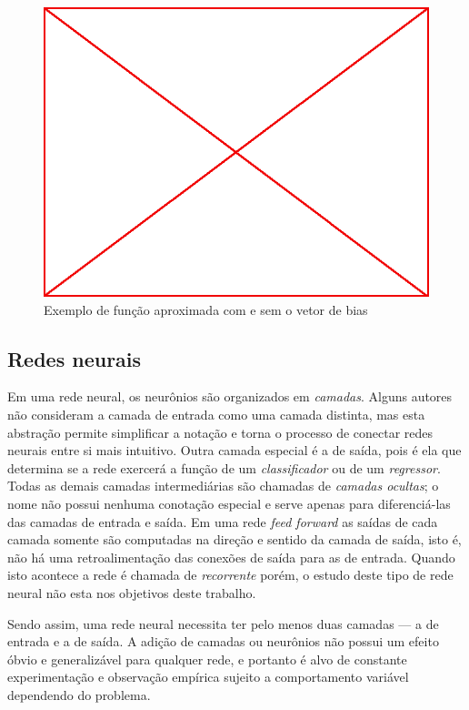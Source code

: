 \begin{figure}
  \caption{Exemplo de função aproximada com e sem o vetor de bias}
  \begin{center}
    \includegraphics[scale=0.5]{placeholder}
  \end{center}
\end{figure}

\subsection{Redes neurais}

Em uma rede neural, os neurônios são organizados em \emph{camadas}. Alguns
autores não consideram a camada de entrada como uma camada distinta, mas esta
abstração permite simplificar a notação e torna o processo de conectar redes
neurais entre si mais intuitivo. Outra camada especial é a de saída, pois é
ela que determina se a rede exercerá a função de um \emph{classificador} ou de
um \emph{regressor}. Todas as demais camadas intermediárias são chamadas de
\emph{camadas ocultas}; o nome não possui nenhuma conotação especial e serve
apenas para diferenciá-las das camadas de entrada e saída. Em uma rede
\emph{feed forward} as saídas de cada camada somente são computadas na direção
e sentido da camada de saída, isto é, não há uma retroalimentação das conexões
de saída para as de entrada. Quando isto acontece a rede é chamada de
\emph{recorrente} porém, o estudo deste tipo de rede neural não esta nos
objetivos deste trabalho.

Sendo assim, uma rede neural necessita ter pelo menos duas camadas --- a de
entrada e a de saída. A adição de camadas ou neurônios não possui um efeito
óbvio e generalizável para qualquer rede, e portanto é alvo de constante
experimentação e observação empírica sujeito a comportamento variável
dependendo do problema.

